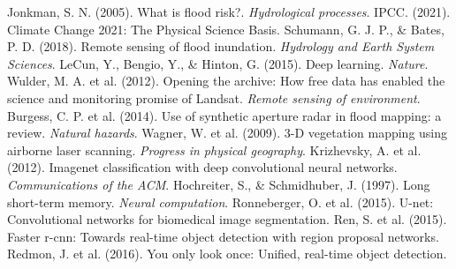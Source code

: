 \documentclass{article}
\begin{document}
\begin{thebibliography}{9}
 Jonkman, S. N. (2005). What is flood risk?. \emph{Hydrological processes}.
 IPCC. (2021). Climate Change 2021: The Physical Science Basis.
 Schumann, G. J. P., \& Bates, P. D. (2018). Remote sensing of flood inundation. \emph{Hydrology and Earth System Sciences}.
 LeCun, Y., Bengio, Y., \& Hinton, G. (2015). Deep learning. \emph{Nature}.
 Wulder, M. A. et al. (2012). Opening the archive: How free data has enabled the science and monitoring promise of Landsat. \emph{Remote sensing of environment}.
 Burgess, C. P. et al. (2014). Use of synthetic aperture radar in flood mapping: a review. \emph{Natural hazards}.
 Wagner, W. et al. (2009). 3-D vegetation mapping using airborne laser scanning. \emph{Progress in physical geography}.
 Krizhevsky, A. et al. (2012). Imagenet classification with deep convolutional neural networks. \emph{Communications of the ACM}.
 Hochreiter, S., \& Schmidhuber, J. (1997). Long short-term memory. \emph{Neural computation}.
 Ronneberger, O. et al. (2015). U-net: Convolutional networks for biomedical image segmentation.
 Ren, S. et al. (2015). Faster r-cnn: Towards real-time object detection with region proposal networks.
 Redmon, J. et al. (2016). You only look once: Unified, real-time object detection.
\end{thebibliography}
\end{document}
